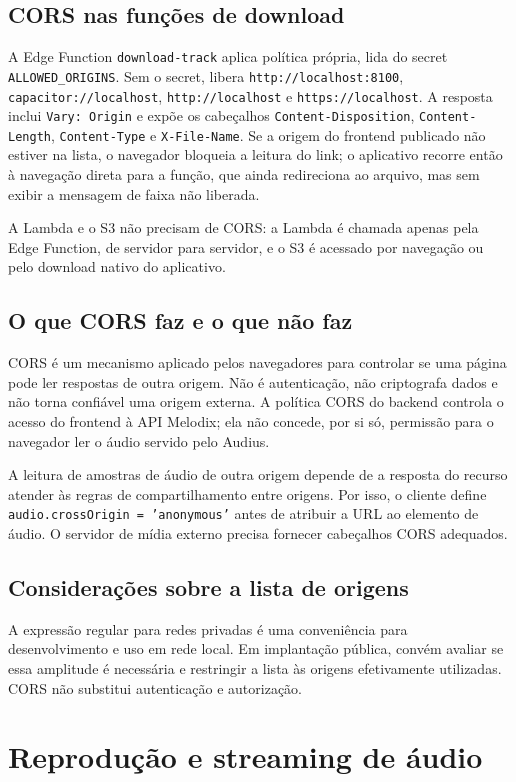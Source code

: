 \documentclass[12pt,a4paper,oneside]{report}
\begin{document}
\section{CORS nas funções de download}
A Edge Function \texttt{download-track} aplica política própria, lida do secret \texttt{ALLOWED\_ORIGINS}. Sem o secret, libera \texttt{http://localhost:8100}, \texttt{capacitor://localhost}, \texttt{http://localhost} e \texttt{https://localhost}. A resposta inclui \texttt{Vary: Origin} e expõe os cabeçalhos \texttt{Content-Disposition}, \texttt{Content-Length}, \texttt{Content-Type} e \texttt{X-File-Name}. Se a origem do frontend publicado não estiver na lista, o navegador bloqueia a leitura do link; o aplicativo recorre então à navegação direta para a função, que ainda redireciona ao arquivo, mas sem exibir a mensagem de faixa não liberada.

A Lambda e o S3 não precisam de CORS: a Lambda é chamada apenas pela Edge Function, de servidor para servidor, e o S3 é acessado por navegação ou pelo download nativo do aplicativo.

\section{O que CORS faz e o que não faz}
CORS é um mecanismo aplicado pelos navegadores para controlar se uma página pode ler respostas de outra origem. Não é autenticação, não criptografa dados e não torna confiável uma origem externa. A política CORS do backend controla o acesso do frontend à API Melodix; ela não concede, por si só, permissão para o navegador ler o áudio servido pelo Audius.

A leitura de amostras de áudio de outra origem depende de a resposta do recurso atender às regras de compartilhamento entre origens. Por isso, o cliente define \texttt{audio.crossOrigin = 'anonymous'} antes de atribuir a URL ao elemento de áudio. O servidor de mídia externo precisa fornecer cabeçalhos CORS adequados.

\section{Considerações sobre a lista de origens}
A expressão regular para redes privadas é uma conveniência para desenvolvimento e uso em rede local. Em implantação pública, convém avaliar se essa amplitude é necessária e restringir a lista às origens efetivamente utilizadas. CORS não substitui autenticação e autorização.

\chapter{Reprodução e streaming de áudio}
\end{document}
